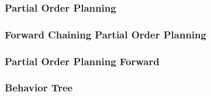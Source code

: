 \subsubsection{Partial Order Planning}
\subsubsection{Forward Chaining Partial Order Planning}
\subsubsection{Partial Order Planning Forward}
\citep{popf}
\subsubsection{Behavior Tree}